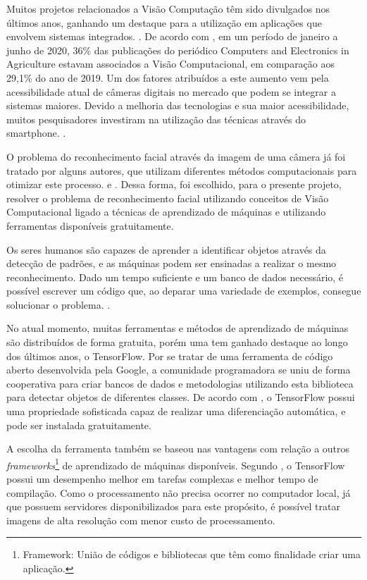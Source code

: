 Muitos projetos relacionados a Visão Computação têm sido divulgados nos últimos anos, ganhando um destaque para a utilização em aplicações que envolvem sistemas integrados. \cite{JESUS19}. De acordo com \cite{santos2020visao}, em um período de janeiro a junho de 2020, 36\% das publicações do periódico Computers and Electronics in Agriculture estavam associados a Visão Computacional, em comparação aos 29,1\% do ano de 2019. Um dos fatores atribuídos a este aumento vem pela acessibilidade atual de câmeras digitais no mercado que podem se integrar a sistemas maiores. Devido a melhoria das tecnologias e sua maior acessibilidade, muitos pesquisadores investiram na utilização das técnicas através do smartphone. \cite{canez2017proposta}.

O problema do reconhecimento facial através da imagem de uma câmera já foi tratado por alguns autores, que utilizam diferentes métodos computacionais para otimizar este processo. \cite{okabe2015reconhecimento} e \cite{maia2016detecccao}. Dessa forma, foi escolhido, para o presente projeto, resolver o problema de reconhecimento facial utilizando conceitos de Visão Computacional ligado a técnicas de aprendizado de máquinas e utilizando ferramentas disponíveis gratuitamente.

Os seres humanos são capazes de aprender a identificar objetos através da detecção de padrões, e as máquinas podem ser ensinadas a realizar o mesmo reconhecimento. Dado um tempo suficiente e um banco de dados necessário, é possível escrever um código que, ao deparar uma variedade de exemplos, consegue solucionar o problema. \cite{shukla18}.

No atual momento, muitas ferramentas e métodos de aprendizado de máquinas são distribuídos de forma gratuita, porém uma tem ganhado destaque ao longo dos últimos anos, o TensorFlow. Por se tratar de uma ferramenta de código aberto desenvolvida pela Google, a comunidade programadora se uniu de forma cooperativa para criar bancos de dados e metodologias utilizando esta biblioteca para detectar objetos de diferentes classes. De acordo com \cite{shukla18}, o TensorFlow possui uma propriedade sofisticada capaz de realizar uma diferenciação automática, e pode ser instalada gratuitamente.

A escolha da ferramenta também se baseou nas vantagens com relação a outros \textit{frameworks}\footnote{Framework: União de códigos e bibliotecas que têm como finalidade criar uma aplicação.} de aprendizado de máquinas disponíveis. Segundo \cite{lecun15}, o TensorFlow possui um desempenho melhor em tarefas complexas e melhor tempo de compilação. Como o processamento não precisa ocorrer no computador local, já que possuem servidores disponibilizados para este propósito, é possível tratar imagens de alta resolução com menor custo de processamento.


